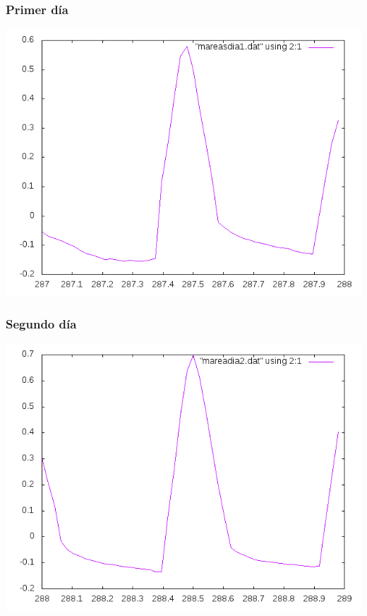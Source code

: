 \documentclass[10pt]{article}
\begin{document}
\subsubsection{Primer día}
\begin{center}
   \includegraphics[scale=0.8]{day1.png}
\end{center}

\subsubsection{Segundo día}
\begin{center}
   \includegraphics[scale=0.8]{day2.png}
\end{center}
\end{document}

